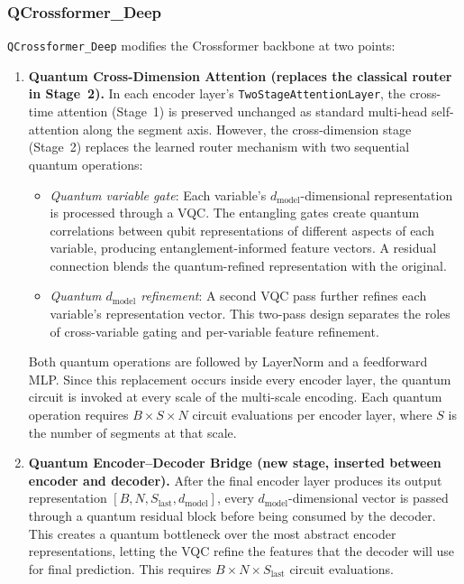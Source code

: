 \documentclass[11pt]{article}
\begin{document}
\subsubsection*{QCrossformer\_Deep}

\texttt{QCrossformer\_Deep} modifies the Crossformer backbone at two points:

\begin{enumerate}
  \item \textbf{Quantum Cross-Dimension Attention (replaces the classical router in Stage~2).} In each encoder layer's \texttt{TwoStageAttentionLayer}, the cross-time attention (Stage~1) is preserved unchanged as standard multi-head self-attention along the segment axis. However, the cross-dimension stage (Stage~2) replaces the learned router mechanism with two sequential quantum operations:
  \begin{itemize}
    \item \emph{Quantum variable gate}: Each variable's $d_\text{model}$-dimensional representation is processed through a VQC. The entangling gates create quantum correlations between qubit representations of different aspects of each variable, producing entanglement-informed feature vectors. A residual connection blends the quantum-refined representation with the original.
    \item \emph{Quantum $d_\text{model}$ refinement}: A second VQC pass further refines each variable's representation vector. This two-pass design separates the roles of cross-variable gating and per-variable feature refinement.
  \end{itemize}
  Both quantum operations are followed by LayerNorm and a feedforward MLP. Since this replacement occurs inside every encoder layer, the quantum circuit is invoked at every scale of the multi-scale encoding. Each quantum operation requires $B \times S \times N$ circuit evaluations per encoder layer, where $S$ is the number of segments at that scale.

  \item \textbf{Quantum Encoder--Decoder Bridge (new stage, inserted between encoder and decoder).} After the final encoder layer produces its output representation $[B, N, S_\text{last}, d_\text{model}]$, every $d_\text{model}$-dimensional vector is passed through a quantum residual block before being consumed by the decoder. This creates a quantum bottleneck over the most abstract encoder representations, letting the VQC refine the features that the decoder will use for final prediction. This requires $B \times N \times S_\text{last}$ circuit evaluations.
\end{enumerate}
\end{document}
